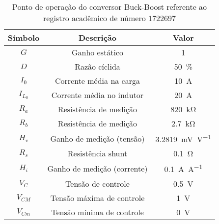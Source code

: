 \begin{table}[!ht]
\centering
\caption{Ponto de operação do conversor Buck-Boost referente ao registro acadêmico de número $1722697$}
\label{tab:steadystate}
\begin{tabular}{@{}ccc@{}}
\toprule
\textbf{Símbolo} & \textbf{Descrição} & \textbf{Valor}\\ \midrule
$G$ & Ganho estático & \SI{1}{}\\
$D$ & Razão cíclida  & \SI{50}{\%}\\
$I_0$ & Corrente média na carga  & \SI{10}{\A} \\
$I_{L_0}$ & Corrente média no indutor & \SI{20}{\A} \\
$R_a$ & Resistência de medição & \SI{820}{\kilo\ohm} \\
$R_b$ & Resistência de medição & \SI{2.7}{\kilo\ohm} \\
$H_v$ & Ganho de medição (tensão) & \SI{3.2819}{\milli\V\per\V} \\
$R_s$ & Resistência shunt & \SI{0.1}{\ohm} \\
$H_i$ & Ganho de medição (corrente) & \SI{0.1}{\A\per\A} \\
$V_C$ & Tensão de controle  & \SI{0.5}{\V} \\
$V_{CM}$ & Tensão máxima de controle  & \SI{1}{\V} \\
$V_{Cm}$ & Tensão mínima de controle  & \SI{0}{\V} \\
\bottomrule
\end{tabular}
\end{table}

